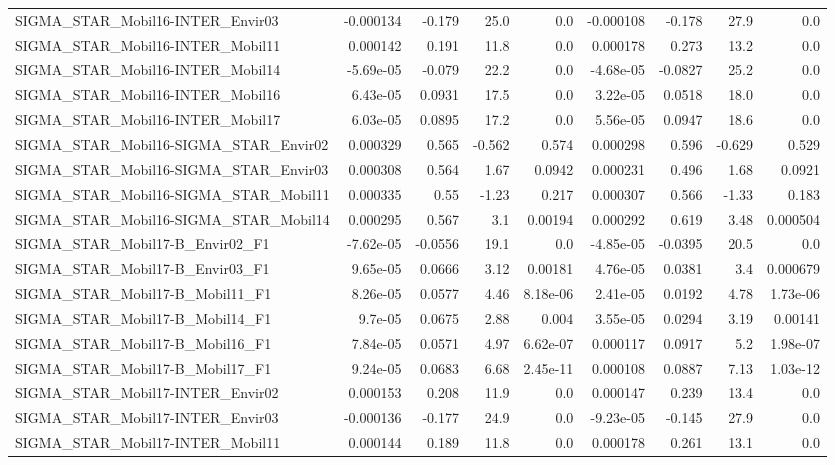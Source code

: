 \begin{tabular}{lrrrrrrrr}
SIGMA_STAR_Mobil16-INTER_Envir03 & -0.000134 & -0.179 & 25.0 & 0.0 & -0.000108 & -0.178 & 27.9 & 0.0 \\
SIGMA_STAR_Mobil16-INTER_Mobil11 & 0.000142 & 0.191 & 11.8 & 0.0 & 0.000178 & 0.273 & 13.2 & 0.0 \\
SIGMA_STAR_Mobil16-INTER_Mobil14 & -5.69e-05 & -0.079 & 22.2 & 0.0 & -4.68e-05 & -0.0827 & 25.2 & 0.0 \\
SIGMA_STAR_Mobil16-INTER_Mobil16 & 6.43e-05 & 0.0931 & 17.5 & 0.0 & 3.22e-05 & 0.0518 & 18.0 & 0.0 \\
SIGMA_STAR_Mobil16-INTER_Mobil17 & 6.03e-05 & 0.0895 & 17.2 & 0.0 & 5.56e-05 & 0.0947 & 18.6 & 0.0 \\
SIGMA_STAR_Mobil16-SIGMA_STAR_Envir02 & 0.000329 & 0.565 & -0.562 & 0.574 & 0.000298 & 0.596 & -0.629 & 0.529 \\
SIGMA_STAR_Mobil16-SIGMA_STAR_Envir03 & 0.000308 & 0.564 & 1.67 & 0.0942 & 0.000231 & 0.496 & 1.68 & 0.0921 \\
SIGMA_STAR_Mobil16-SIGMA_STAR_Mobil11 & 0.000335 & 0.55 & -1.23 & 0.217 & 0.000307 & 0.566 & -1.33 & 0.183 \\
SIGMA_STAR_Mobil16-SIGMA_STAR_Mobil14 & 0.000295 & 0.567 & 3.1 & 0.00194 & 0.000292 & 0.619 & 3.48 & 0.000504 \\
SIGMA_STAR_Mobil17-B_Envir02_F1 & -7.62e-05 & -0.0556 & 19.1 & 0.0 & -4.85e-05 & -0.0395 & 20.5 & 0.0 \\
SIGMA_STAR_Mobil17-B_Envir03_F1 & 9.65e-05 & 0.0666 & 3.12 & 0.00181 & 4.76e-05 & 0.0381 & 3.4 & 0.000679 \\
SIGMA_STAR_Mobil17-B_Mobil11_F1 & 8.26e-05 & 0.0577 & 4.46 & 8.18e-06 & 2.41e-05 & 0.0192 & 4.78 & 1.73e-06 \\
SIGMA_STAR_Mobil17-B_Mobil14_F1 & 9.7e-05 & 0.0675 & 2.88 & 0.004 & 3.55e-05 & 0.0294 & 3.19 & 0.00141 \\
SIGMA_STAR_Mobil17-B_Mobil16_F1 & 7.84e-05 & 0.0571 & 4.97 & 6.62e-07 & 0.000117 & 0.0917 & 5.2 & 1.98e-07 \\
SIGMA_STAR_Mobil17-B_Mobil17_F1 & 9.24e-05 & 0.0683 & 6.68 & 2.45e-11 & 0.000108 & 0.0887 & 7.13 & 1.03e-12 \\
SIGMA_STAR_Mobil17-INTER_Envir02 & 0.000153 & 0.208 & 11.9 & 0.0 & 0.000147 & 0.239 & 13.4 & 0.0 \\
SIGMA_STAR_Mobil17-INTER_Envir03 & -0.000136 & -0.177 & 24.9 & 0.0 & -9.23e-05 & -0.145 & 27.9 & 0.0 \\
SIGMA_STAR_Mobil17-INTER_Mobil11 & 0.000144 & 0.189 & 11.8 & 0.0 & 0.000178 & 0.261 & 13.1 & 0.0 \\

\end{tabular}
